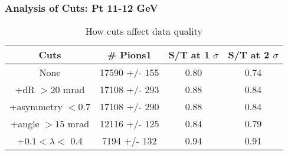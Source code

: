 \frame
{
\frametitle{Analysis of Cuts: Pt 11-12 GeV}
\begin{table}
\caption{How cuts affect data quality}
\centering
\begin{tabular}{c c c c}
\hline\hline
Cuts & \# Pions1 & S/T at 1 $\sigma$ & S/T at 2 $\sigma$ \\ [0.5ex]
\hline
None & 17590 +/-  155 & 0.80 & 0.74 \\ %
+dR $> 20$ mrad & 17108 +/-  293 & 0.88 & 0.84 \\ %
+asymmetry $< 0.7$ & 17108 +/-  290 & 0.88 & 0.84 \\ %
+angle $> 15$ mrad & 12116 +/-  125 & 0.84 & 0.79 \\ %
+$0.1 < \lambda <$ 0.4 & 7194 +/-  132 & 0.94 & 0.91 \\ %
[1ex]
\hline
\end{tabular}
\label{table:nonlin}
\end{table}
}
